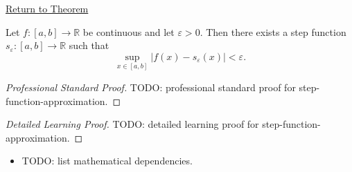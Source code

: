 \newpage
{}
\label{prf:step-function-approximation}

\begin{remark*}[Return]
\hyperref[thm:step-function-approximation]{Return to Theorem}
\end{remark*}

\begin{theorem*}
Let $f:[a,b]\to\mathbb{R}$ be continuous and let $\varepsilon>0$.
Then there exists a step function $s_\varepsilon:[a,b]\to\mathbb{R}$ such that
\[
\sup_{x\in[a,b]} |f(x)-s_\varepsilon(x)|<\varepsilon.
\]
\end{theorem*}

\begin{proof}[Professional Standard Proof]
\LRAProofBodyStart
TODO: professional standard proof for step-function-approximation.
\end{proof}

\begin{proof}[Detailed Learning Proof]
\LRAProofBodyStart
TODO: detailed learning proof for step-function-approximation.
\end{proof}

\begin{remark*}
\end{remark*}

\begin{dependencies}
\begin{itemize}
  \item TODO: list mathematical dependencies.
\end{itemize}
\end{dependencies}

\clearpage

